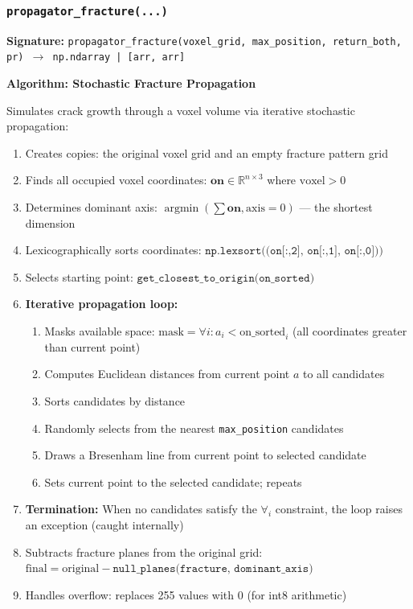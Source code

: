 \documentclass[12pt,a4paper]{article}
\begin{document}
\subsubsection{\texttt{propagator\_fracture(...)}}

\textbf{Signature:} \texttt{propagator\_fracture(voxel\_grid, max\_position, return\_both, pr) $\rightarrow$ np.ndarray | [arr, arr]}

\textbf{Algorithm: Stochastic Fracture Propagation}

Simulates crack growth through a voxel volume via iterative stochastic propagation:

\begin{enumerate}
  \item Creates copies: the original voxel grid and an empty fracture pattern grid
  \item Finds all occupied voxel coordinates: $\mathbf{on} \in \mathbb{R}^{n \times 3}$ where $\text{voxel}>0$
  \item Determines dominant axis: $\operatorname{argmin}(\sum \mathbf{on}, \text{axis}=0)$ --- the shortest dimension
  \item Lexicographically sorts coordinates: $\texttt{np.lexsort((on[:,2], on[:,1], on[:,0]))}$
  \item Selects starting point: $\texttt{get\_closest\_to\_origin(on\_sorted)}$
  \item \textbf{Iterative propagation loop:}
    \begin{enumerate}
      \item Masks available space: $\text{mask} = \forall i: a_i < \text{on\_sorted}_i$ (all coordinates greater than current point)
      \item Computes Euclidean distances from current point $a$ to all candidates
      \item Sorts candidates by distance
      \item Randomly selects from the nearest \texttt{max\_position} candidates
      \item Draws a Bresenham line from current point to selected candidate
      \item Sets current point to the selected candidate; repeats
    \end{enumerate}
  \item \textbf{Termination:} When no candidates satisfy the $\forall_i$ constraint, the loop raises an exception (caught internally)
  \item Subtracts fracture planes from the original grid: $\text{final} = \text{original} - \texttt{null\_planes(fracture, dominant\_axis)}$
  \item Handles overflow: replaces 255 values with 0 (for int8 arithmetic)
\end{enumerate}
\end{document}
